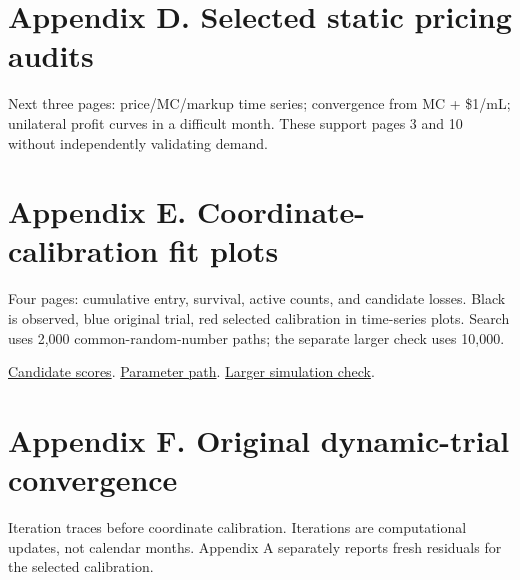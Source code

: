 \documentclass[11pt,]{article}
\begin{document}
\clearpage

\section{Appendix D. Selected static pricing
audits}\label{appendix-d.-selected-static-pricing-audits}

Next three pages: price/MC/markup time series; convergence from MC +
\$1/mL; unilateral profit curves in a difficult month. These support
pages 3 and 10 without independently validating demand.



\clearpage

\section{Appendix E. Coordinate-calibration fit
plots}\label{appendix-e.-coordinate-calibration-fit-plots}

Four pages: cumulative entry, survival, active counts, and candidate
losses. Black is observed, blue original trial, red selected calibration
in time-series plots. Search uses 2,000 common-random-number paths; the
separate larger check uses 10,000.

\href{../../output/dynamic_entry_exit/coordinate_search_2026-11-06/candidate_scores.csv}{Candidate
scores}.
\href{../../output/dynamic_entry_exit/coordinate_search_2026-11-06/coordinate_path.csv}{Parameter
path}.
\href{../../output/dynamic_entry_exit/coordinate_search_2026-11-06/independent_simulation_check.csv}{Larger
simulation check}.



\clearpage

\section{Appendix F. Original dynamic-trial
convergence}\label{appendix-f.-original-dynamic-trial-convergence}

Iteration traces before coordinate calibration. Iterations are
computational updates, not calendar months. Appendix A separately
reports fresh residuals for the selected calibration.
\end{document}
